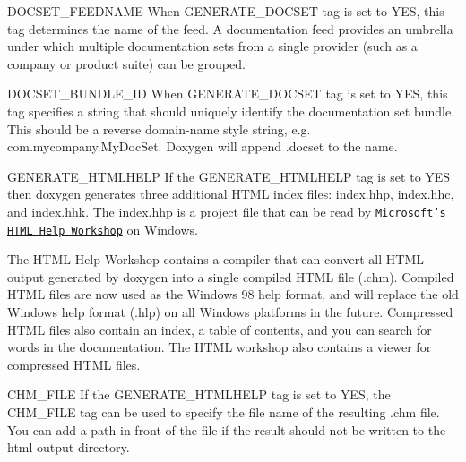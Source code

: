 \begin{DoxyDescription}
\label{config_cfg_docset_feedname}
\hypertarget{config_cfg_docset_feedname}{}
 
\item[{\ttfamily DOCSET\_\-FEEDNAME} ] When {\ttfamily GENERATE\_\-DOCSET} tag is set to {\ttfamily YES}, this tag determines the name of the feed. A documentation feed provides an umbrella under which multiple documentation sets from a single provider (such as a company or product suite) can be grouped.

\label{config_cfg_docset_bundle_id}
\hypertarget{config_cfg_docset_bundle_id}{}
 
\item[{\ttfamily DOCSET\_\-BUNDLE\_\-ID} ]When {\ttfamily GENERATE\_\-DOCSET} tag is set to {\ttfamily YES}, this tag specifies a string that should uniquely identify the documentation set bundle. This should be a reverse domain-\/name style string, e.g. {\ttfamily com.mycompany.MyDocSet}. Doxygen will append {\ttfamily .docset} to the name.

\label{config_cfg_generate_htmlhelp}
\hypertarget{config_cfg_generate_htmlhelp}{}
 
\item[{\ttfamily GENERATE\_\-HTMLHELP} ] If the {\ttfamily GENERATE\_\-HTMLHELP} tag is set to {\ttfamily YES} then doxygen generates three additional HTML index files: {\ttfamily index.hhp}, {\ttfamily index.hhc}, and {\ttfamily index.hhk}. The {\ttfamily index.hhp} is a project file that can be read by \href{http://msdn.microsoft.com/library/default.asp?url=/library/en-us/htmlhelp/html/vsconHH1Start.asp}{\tt Microsoft's HTML Help Workshop} on Windows.

The HTML Help Workshop contains a compiler that can convert all HTML output generated by doxygen into a single compiled HTML file (.chm). Compiled HTML files are now used as the Windows 98 help format, and will replace the old Windows help format (.hlp) on all Windows platforms in the future. Compressed HTML files also contain an index, a table of contents, and you can search for words in the documentation. The HTML workshop also contains a viewer for compressed HTML files.

\label{config_cfg_chm_file}
\hypertarget{config_cfg_chm_file}{}
 
\item[{\ttfamily CHM\_\-FILE} ] If the {\ttfamily GENERATE\_\-HTMLHELP} tag is set to {\ttfamily YES}, the {\ttfamily CHM\_\-FILE} tag can be used to specify the file name of the resulting .chm file. You can add a path in front of the file if the result should not be written to the html output directory.


\end{DoxyDescription}
